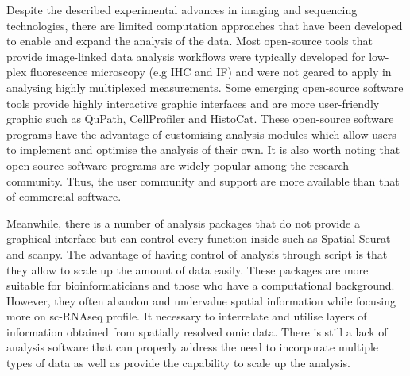 Despite the described experimental advances in imaging and sequencing technologies, there are limited computation approaches that have been developed to enable and expand the analysis of the data. Most open-source tools that provide image-linked data analysis workflows were typically developed for low-plex fluorescence microscopy (e.g IHC and IF) and were not geared to apply in analysing highly multiplexed measurements. Some emerging open-source software tools provide highly interactive graphic interfaces and are more user-friendly graphic such as QuPath, CellProfiler and HistoCat. These open-source software programs have the advantage of customising analysis modules which allow users to implement and optimise the analysis of their own. It is also worth noting that open-source software programs are widely popular among the research community. Thus, the user community and support are more available  than that of commercial software. 

Meanwhile, there is a number of analysis packages that do not provide a graphical interface but can control every function inside such as Spatial Seurat and scanpy. The advantage of having control of analysis through script is that they allow to scale up the amount of data easily. These packages are more suitable for bioinformaticians and those who have a computational background. However, they often abandon and undervalue spatial information while focusing more on sc-RNAseq profile. It necessary to interrelate and utilise layers of information obtained from spatially resolved omic data. There is still a lack of analysis software that can properly address the need to incorporate multiple types of data as well as provide the capability to scale up the analysis.


\label{subsec:ST_seq}





